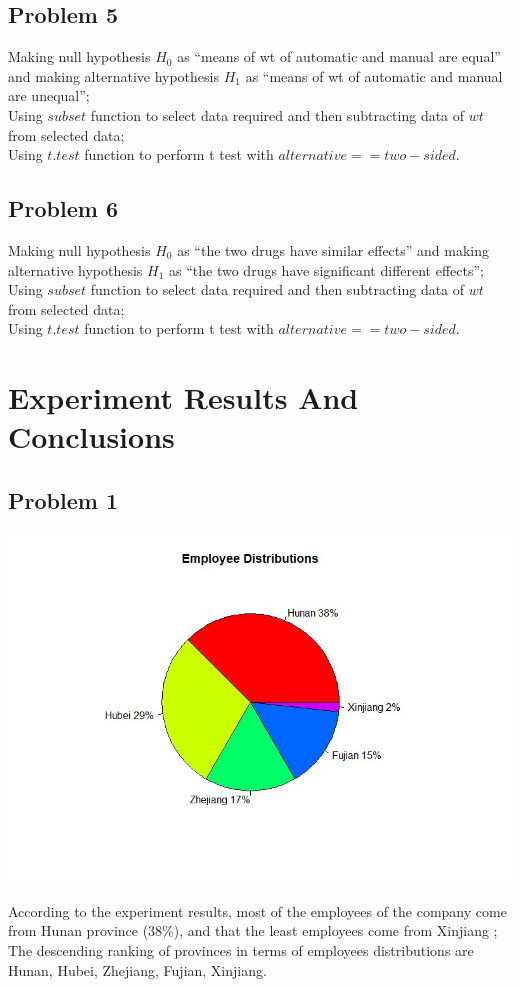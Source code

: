 \documentclass[12pt]{article}
\begin{document}
\subsection*{Problem 5}  
Making null hypothesis $H_{0}$ as “means of wt of automatic and manual are equal” and making alternative hypothesis $H_{1}$ as “means of wt of automatic and manual are unequal”; \\ 
Using $subset$ function to select data required and then subtracting data of $wt$ from selected data;\\
 Using $t.test$ function to perform t test with $alternative == two-sided$.  \\
\subsection*{Problem 6} 
 Making null hypothesis $H_{0}$ as “the two drugs have similar effects” and making alternative hypothesis $H_{1}$ as “the two drugs have significant different effects”; \\ 
 Using $subset$ function to select data required and then subtracting data of $wt$ from selected data;\\ 
 Using $t.test$ function to perform t test with $alternative == two-sided$.  


\section{Experiment Results And Conclusions}
\subsection*{Problem 1}

\begin{center}
\includegraphics[width=1.2\textwidth]{Piechart.jpg}
\end{center}
According to the experiment results, most of the employees of the company come from Hunan province (38\%), and that the least employees come from Xinjiang ; The descending ranking of provinces in terms of employees distributions are Hunan, Hubei, Zhejiang, Fujian, Xinjiang.
\end{document}
